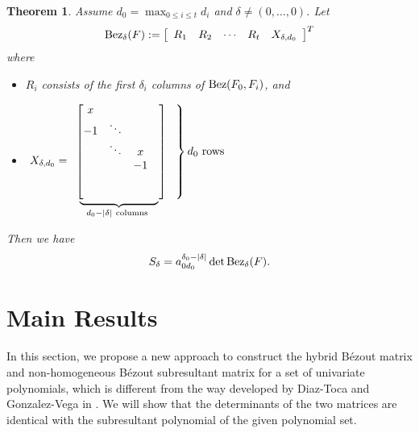 \documentclass{article}
\newtheorem{theorem}{Theorem}
\begin{document}
\begin{theorem}\label{thm:bezsres}
Assume $d_0=\max_{0\le i\le t}d_i$ and $\delta\ne(0,\ldots,0)$. Let
\[ {{\rm Bez}_\delta }(F): = {\left[ {\begin{array}{*{20}{l}}{{R_1}}&{{R_2}}& \cdots &{{R_t}}&{{X_{\delta ,{d_0}}}}
\end{array}} \right]^T}
\]
where \begin{itemize}
\item
$R_i$ consists of the first $\delta_i$ columns of $ {\rm Bez}(F_0,F_i)$, and

\item
$\ X_{\delta,d_0}=%
\begin{array}
[c]{l}%
\begin{bmatrix}
x &  &  \\
-1 & \ddots &  \\
& \ddots & x & \\
&  & -1 &\\
&  &  & \\
&  &  &
\end{bmatrix}\hspace{-.8em}
\left.
\begin{array}
[c]{c}%
\\
\\
\\
\\
\\
\\
\
\end{array}
\right\} d_{0}~\text{rows}\\[-8pt]
~\underbrace{\hspace{7em}}_{d_{0}-\left|  \delta\right|
~\text{columns}~}%
\end{array}
$

\end{itemize}
 Then we have
$${S_\delta }= a_{0d_{0}}^{\delta_{0}-\left|  \delta\right|  }\det
{{\rm Bez}_\delta }(F).
$$
\end{theorem}


\section{Main Results}\label{sec:bez}
In this section, we propose a new approach to construct the hybrid B\'ezout matrix and  non-homogeneous B\'ezout subresultant matrix for a set of univariate polynomials, which is different from the way developed by Diaz-Toca and Gonzalez-Vega in \cite{diaz2004various}. We will show that the determinants of the two matrices are identical with  the subresultant  polynomial of the given polynomial set.
\end{document}
